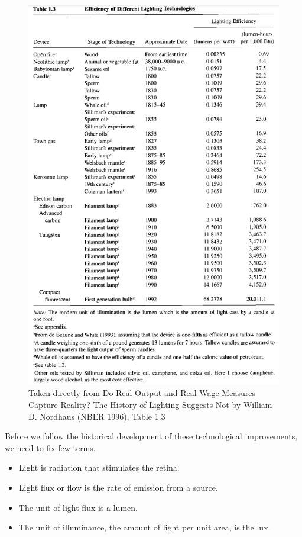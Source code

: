 \documentclass[
]{book}
\providecommand{\tightlist}{%
  \setlength{\itemsep}{0pt}\setlength{\parskip}{0pt}}
\begin{document}
\begin{figure}

{\centering \includegraphics[width=1\linewidth]{img/growth2/nordhaustab1p3} 

}

\caption{Taken directly from Do Real-Output and Real-Wage Measures Capture Reality? The History of Lighting Suggests Not by William D. Nordhaus (NBER 1996), Table 1.3}\label{fig:nordhaustab1p3}
\end{figure}

Before we follow the historical development of these technological improvements, we need to fix few terms.

\begin{itemize}
\tightlist
\item
  Light is radiation that stimulates the retina.
\item
  Light flux or flow is the rate of emission from a source.
\item
  The unit of light flux is a lumen.
\item
  The unit of illuminance, the amount of light per unit area, is the lux.
\end{itemize}
\end{document}
